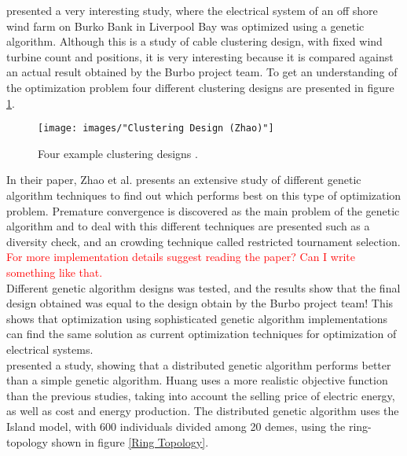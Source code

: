 \noindent \cite{Zhao} presented a very interesting study, where the electrical system of an off shore wind farm on Burko Bank in Liverpool Bay was optimized using a genetic algorithm. Although this is a study of cable clustering design, with fixed wind turbine count and positions, it is very interesting because it is compared against an actual result obtained by the Burbo project team. To get an understanding of the optimization problem four different clustering designs are presented in figure \ref{Clustering Design}.\\


\begin{figure}[h!]
\begin{center}
\texttt{[image: images/"Clustering Design (Zhao)"]}
\caption{Four example clustering designs \citep{Zhao}.}
\label{Clustering Design}
\end{center}
\end{figure}


\noindent In their paper, Zhao et al. presents an extensive study of different genetic algorithm techniques to find out which performs best on this type of optimization problem. Premature convergence is discovered as the main problem of the genetic algorithm and to deal with this different techniques are presented such as a diversity check, and an crowding technique called restricted tournament selection. \textcolor{red}{For more implementation details suggest reading the paper? Can I write something like that.}\\

\noindent Different genetic algorithm designs was tested, and the results show that the final design obtained was equal to the design obtain by the Burbo project team! This shows that optimization using sophisticated genetic algorithm implementations can find the same solution as current optimization techniques for optimization of electrical systems.\\


\noindent \cite{Huang} presented a study, showing that a distributed genetic algorithm performs better than a simple genetic algorithm. Huang uses a more realistic objective function than the previous studies, taking into account the selling price of electric energy, as well as cost and energy production. The distributed genetic algorithm uses the Island model, with 600 individuals divided among 20 demes, using the ring-topology shown in figure \ref{Ring Topology}.\\

